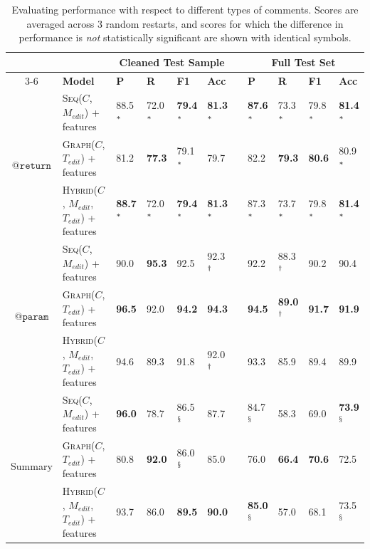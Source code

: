 \documentclass[letterpaper]{article} %
\makeatletter
\newcommand{\CodeIn}[1]{{\ifmmode{\mathtt{#1}}\else$\mathtt{#1}$\fi}}
\newcommand{\Return}{\CodeIn{@return}}
\newcommand{\Param}{\CodeIn{@param}}
\newcommand{\Comment}{$C$}
\newcommand{\EditCode}{$M_{edit}$}
\newcommand{\EditTree}{$T_{edit}$}
\newcommand{\SeqModel}{\textsc{Seq}}
\newcommand{\GraphModel}{\textsc{Graph}}
\newcommand{\HybridModel}{\textsc{Hybrid}}
\newcommand{\JustInTimeSeq}{\SeqModel{}(\Comment{}, \EditCode{})}
\newcommand{\JustInTimeGraph}{\GraphModel{}(\Comment{}, \EditTree{})}
\newcommand{\JustInTimeHybrid}{\HybridModel{}(\Comment{}, \EditCode{}, \EditTree{})}
\def\@fnsymbol#1{\ensuremath{\ifcase#1\or *\or \dagger\or \ddagger\or
\mathsection\or \mathparagraph\or \|\or **\or \dagger\dagger
\or \ddagger\ddagger \else\@ctrerr\fi}}
\newcommand{\ssymbol}[1]{^{\@fnsymbol{#1}}}
\makeatother
\begin{document}
\begin{table}[t]
\centering
\small
\begin{tabular}{c@{\hskip 2mm}l@{\hskip 4mm}lllllllll}
\hline
& & \multicolumn{4}{c}{\bf Cleaned Test Sample} & & \multicolumn{4}{c}{\bf Full Test Set} \\
\cline{3-6}
\cline{8-11}
& \bf Model & \bf P & \bf R & \bf F1 & \bf Acc & & \bf P & \bf R & \bf F1 & \bf Acc\\
\hline

\multirow{3}{*}{\Return{}} &
\JustInTimeSeq{} + features & 88.5$\ssymbol{1}$ & 72.0$\ssymbol{1}$ & \bf 79.4$\ssymbol{1}$ & \bf 81.3$\ssymbol{1}$ && \bf 87.6$\ssymbol{1}$ & 73.3$\ssymbol{1}$ & 79.8$\ssymbol{1}$ & \bf 81.4$\ssymbol{1}$ \\
& \JustInTimeGraph{} + features & 81.2  & \bf 77.3 & 79.1$\ssymbol{1}$ & 79.7 && 82.2 & \bf 79.3 & \bf 80.6 & 80.9$\ssymbol{1}$ \\
&  \JustInTimeHybrid{} + features & \bf 88.7$\ssymbol{1}$ & 72.0$\ssymbol{1}$ & \bf 79.4$\ssymbol{1}$ & \bf 81.3$\ssymbol{1}$ && 87.3$\ssymbol{1}$ & 73.7$\ssymbol{1}$ & 79.8$\ssymbol{1}$  & \bf 81.4$\ssymbol{1}$ \\
\hline

\multirow{3}{*}{\Param{}} &
\JustInTimeSeq{} + features &  90.0 & \bf 95.3 & 92.5 & 92.3$\ssymbol{2}$ &&  92.2 & 88.3$\ssymbol{2}$ & 90.2 & 90.4 \\
& \JustInTimeGraph{} + features & \bf 96.5  & 92.0 & \bf 94.2 & \bf 94.3 && \bf 94.5 & \bf 89.0$\ssymbol{2}$ & \bf 91.7 & \bf 91.9 \\
&  \JustInTimeHybrid{} + features &  94.6 & 89.3 & 91.8 & 92.0$\ssymbol{2}$ && 93.3 & 85.9 & 89.4 & 89.9 \\
\hline

\multirow{3}{*}{Summary} &
\JustInTimeSeq{} + features & \bf 96.0  & 78.7 & 86.5$\ssymbol{4}$ & 87.7 &&  84.7$\ssymbol{4}$ & 58.3 & 69.0 & \bf 73.9$\ssymbol{4}$ \\
& \JustInTimeGraph{} + features & 80.8  & \bf 92.0 & 86.0$\ssymbol{4}$ & 85.0 && 76.0 & \bf 66.4 & \bf 70.6 & 72.5 \\
&  \JustInTimeHybrid{} + features & 93.7 & 86.0 & \bf 89.5 & \bf 90.0 && \bf 85.0$\ssymbol{4}$ & 57.0 & 68.1  & 73.5$\ssymbol{4}$ \\
\hline

\end{tabular}
\caption{\label{table:comment-specific} Evaluating performance with respect to different types of comments. Scores are averaged across 3 random restarts, and scores for which the difference in performance is \textit{not} statistically significant are shown with identical symbols.}
\end{table}
\end{document}
